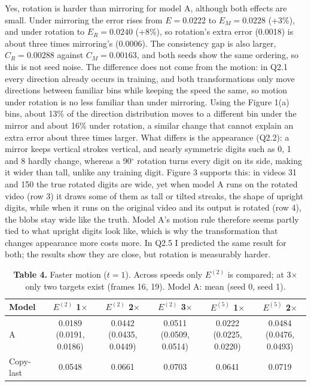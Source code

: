 Yes, rotation is harder than mirroring for model A, although both effects are small. Under mirroring the error rises from $E=0.0222$ to $E_M=0.0228$ (+3\%), and under rotation to $E_R=0.0240$ (+8\%), so rotation's extra error (0.0018) is about three times mirroring's (0.0006). The consistency gap is also larger, $C_R=0.00288$ against $C_M=0.00163$, and both seeds show the same ordering, so this is not seed noise. The difference does not come from the motion: in Q2.1 every direction already occurs in training, and both transformations only move directions between familiar bins while keeping the speed the same, so motion under rotation is no less familiar than under mirroring. Using the Figure 1(a) bins, about 13\% of the direction distribution moves to a different bin under the mirror and about 16\% under rotation, a similar change that cannot explain an extra error about three times larger. What differs is the appearance (Q2.2): a mirror keeps vertical strokes vertical, and nearly symmetric digits such as 0, 1 and 8 hardly change, whereas a 90$^\circ$ rotation turns every digit on its side, making it wider than tall, unlike any training digit. Figure 3 supports this: in videos 31 and 150 the true rotated digits are wide, yet when model A runs on the rotated video (row 3) it draws some of them as tall or tilted streaks, the shape of upright digits, while when it runs on the original video and its output is rotated (row 4), the blobs stay wide like the truth. Model A's motion rule therefore seems partly tied to what upright digits look like, which is why the transformation that changes appearance more costs more. In Q2.5 I predicted the same result for both; the results show they are close, but rotation is measurably harder.

\begin{table}[H]
\centering\small
\begin{tabular}{@{}lccccc@{}}
\toprule
\textbf{Model} & \textbf{$E^{(2)}$ 1$\times$} & \textbf{$E^{(2)}$ 2$\times$} & \textbf{$E^{(2)}$ 3$\times$} & \textbf{$E^{(5)}$ 1$\times$} & \textbf{$E^{(5)}$ 2$\times$} \\
\midrule
A & \makecell{0.0189\\[-1pt]{\tiny(0.0191, 0.0186)}} & \makecell{0.0442\\[-1pt]{\tiny(0.0435, 0.0449)}} & \makecell{0.0511\\[-1pt]{\tiny(0.0509, 0.0514)}} & \makecell{0.0222\\[-1pt]{\tiny(0.0225, 0.0220)}} & \makecell{0.0484\\[-1pt]{\tiny(0.0476, 0.0493)}} \\
Copy-last & 0.0548 & 0.0661 & 0.0703 & 0.0641 & 0.0719 \\
\bottomrule
\end{tabular}
\caption*{\textbf{Table 4.} Faster motion ($t=1$). Across speeds only $E^{(2)}$ is compared; at 3$\times$ only two targets exist (frames 16, 19). Model A: mean (seed 0, seed 1).}
\end{table}

